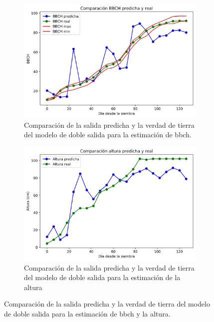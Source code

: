 \begin{figure}[H]
\centering
\begin{subfigure}{\textwidth}
  \centering
  \includegraphics[width=0.95\linewidth]{archivos/tfg/Mean/TEST_PARC_FINAL_BH}
  \caption{Comparación de la salida predicha y la verdad de tierra del modelo de doble salida para la estimación de \gls{bbch}. \label{fig:sub_c1}}
\end{subfigure}
\begin{subfigure}{\textwidth}
  \centering
  \includegraphics[width=0.95\linewidth]{archivos/tfg/Mean/TEST_PARC_FINAL_BH_H}
  \caption{Comparación de la salida predicha y la verdad de tierra del modelo de doble salida para la estimación de la altura\label{fig:sub_c2}}
\end{subfigure}
\caption{Comparación de la salida predicha y la verdad de tierra del modelo de doble salida para la estimación de \gls{bbch} y la altura. \label{fig:comp_bh}}
\end{figure}


